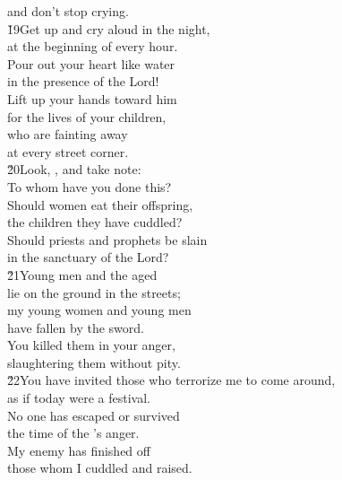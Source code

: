 \begin{poetry}
\poemll    and don't stop crying. \\
\poeml \v{19}Get up and cry aloud in the night, \\
\poemll    at the beginning of every hour. \\
\poeml Pour out your heart like water \\
\poemll    in the presence of the Lord! \\
\poeml Lift up your hands toward him \\
\poemll    for the lives of your children, \\
\poeml who are fainting away \\
\poemll    at every street corner. \\
\poeml \v{20}Look, , and take note: \\
\poemll    To whom have you done this? \\
\poeml Should women eat their offspring, \\
\poemll    the children they have cuddled? \\
\poeml Should priests and prophets be slain \\
\poemll    in the sanctuary of the Lord? \\
\poeml \v{21}Young men and the aged \\
\poemll    lie on the ground in the streets; \\
\poeml my young women and young men \\
\poemll    have fallen by the sword. \\
\poeml You killed them in your anger, \\
\poemll    slaughtering them without pity. \\
\poeml \v{22}You have invited those who terrorize me to come around, \\
\poemll    as if today were a festival. \\
\poeml No one has escaped or survived \\
\poemll    the time of the 's anger. \\
\poeml My enemy has finished off \\
\poemll    those whom I cuddled and raised.
\end{poetry}

